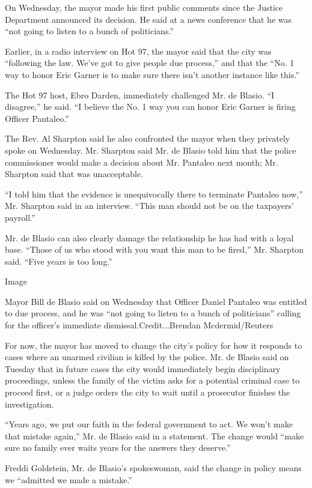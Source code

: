 On Wednesday, the mayor made his first public comments since the Justice
Department announced its decision. He said at a news conference that he
was ``not going to listen to a bunch of politicians.''

Earlier, in a radio interview on Hot 97, the mayor said that the city
was ``following the law. We've got to give people due process,'' and
that the ``No. 1 way to honor Eric Garner is to make sure there isn't
another instance like this.''

The Hot 97 host, Ebro Darden, immediately challenged Mr. de Blasio. ``I
disagree,'' he said. ``I believe the No. 1 way you can honor Eric Garner
is firing Officer Pantaleo.''

The Rev. Al Sharpton said he also confronted the mayor when they
privately spoke on Wednesday. Mr. Sharpton said Mr. de Blasio told him
that the police commissioner would make a decision about Mr. Pantaleo
next month; Mr. Sharpton said that was unacceptable.

``I told him that the evidence is unequivocally there to terminate
Pantaleo now,'' Mr. Sharpton said in an interview. ``This man should not
be on the taxpayers' payroll.''

Mr. de Blasio can also clearly damage the relationship he has had with a
loyal base. ``Those of us who stood with you want this man to be
fired,'' Mr. Sharpton said. ``Five years is too long.''

Image

Mayor Bill de Blasio said on Wednesday that Officer Daniel Pantaleo was
entitled to due process, and he was ``not going to listen to a bunch of
politicians'' calling for the officer's immediate
dismissal.Credit...Brendan Mcdermid/Reuters

For now, the mayor has moved to change the city's policy for how it
responds to cases where an unarmed civilian is killed by the police. Mr.
de Blasio said on Tuesday that in future cases the city would
immediately begin disciplinary proceedings, unless the family of the
victim asks for a potential criminal case to proceed first, or a judge
orders the city to wait until a prosecutor finishes the investigation.

``Years ago, we put our faith in the federal government to act. We won't
make that mistake again,'' Mr. de Blasio said in a statement. The change
would ``make sure no family ever waits years for the answers they
deserve.''

Freddi Goldstein, Mr. de Blasio's spokeswoman, said the change in policy
means we ``admitted we made a mistake.''

